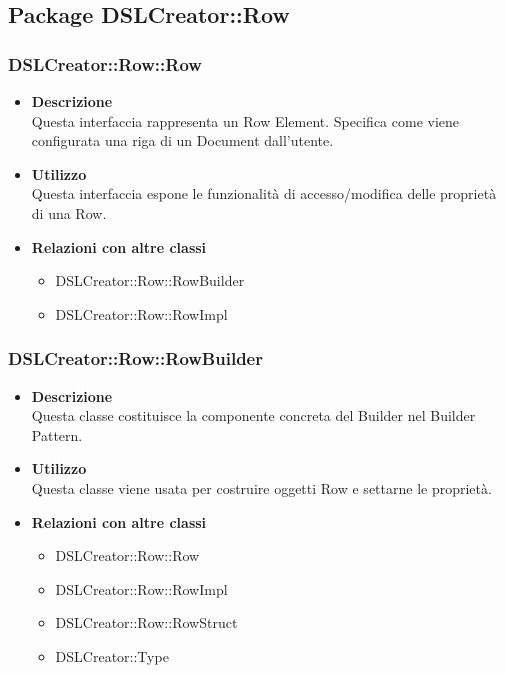 \subsection{Package DSLCreator::Row}
 \subsubsection{DSLCreator::Row::Row}
                    \begin{itemize}
                        \item \textbf{Descrizione} \hfill \\
                          Questa interfaccia rappresenta un Row Element. Specifica come viene configurata una riga di un Document dall'utente.
                        \item \textbf{Utilizzo} \hfill \\
                          Questa interfaccia espone le funzionalità di accesso/modifica delle proprietà di una Row.
                        \item \textbf{Relazioni con altre classi}
                            \begin{itemize}
                              \item DSLCreator::Row::RowBuilder
                              \item DSLCreator::Row::RowImpl
                            \end{itemize}
                    \end{itemize}

 \subsubsection{DSLCreator::Row::RowBuilder}
                    \begin{itemize}
                        \item \textbf{Descrizione} \hfill \\
                          Questa classe costituisce la componente concreta del Builder nel Builder Pattern.
                        \item \textbf{Utilizzo} \hfill \\
                          Questa classe viene usata per costruire oggetti Row e settarne le proprietà.
                        \item \textbf{Relazioni con altre classi}
                            \begin{itemize}
                              \item DSLCreator::Row::Row
                              \item DSLCreator::Row::RowImpl
                              \item DSLCreator::Row::RowStruct
                              \item DSLCreator::Type
                            \end{itemize}
                    \end{itemize}  

